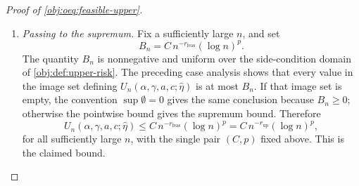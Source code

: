 \begin{proof}[Proof of \cref{obj:oeq:feasible-upper}]
\begin{enumerate}
\item \emph{Passing to the supremum.}  Fix a sufficiently large \(n\), and set
\[
B_n=C\,n^{-r_{\mathrm{feas}}}(\log n)^p .
\]
The quantity \(B_n\) is nonnegative and uniform over the side-condition domain of \cref{obj:def:upper-risk}.  The preceding case analysis shows that every value in the image set defining \(U_n(\alpha,\gamma,a,c;\widehat\eta)\) is at most \(B_n\).  If that image set is empty, the convention \(\sup\emptyset=0\) gives the same conclusion because \(B_n\ge0\); otherwise the pointwise bound gives the supremum bound.  Therefore
\[
U_n(\alpha,\gamma,a,c;\widehat\eta)
\le
C\,n^{-r_{\mathrm{feas}}}(\log n)^{p}
=
C\,n^{-r_{\mathrm{up}}}(\log n)^{p},
\]
for all sufficiently large \(n\), with the single pair \((C,p)\) fixed above.  This is the claimed bound. %
\end{enumerate}
\end{proof}
